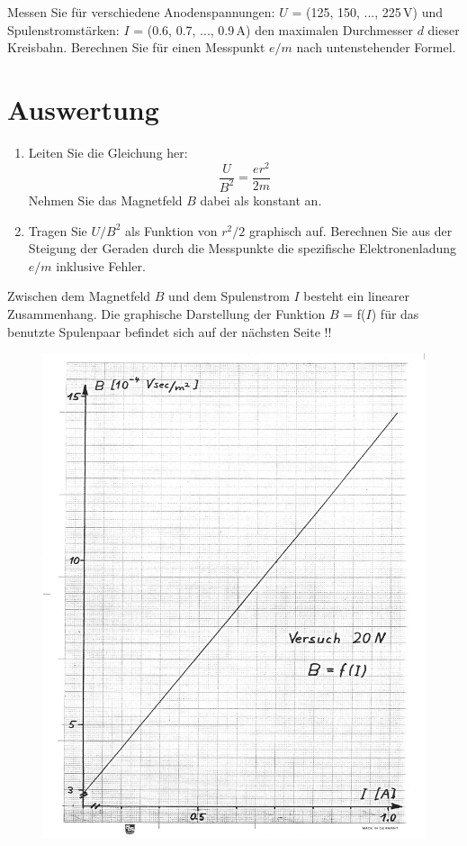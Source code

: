 \noindent
Messen Sie für verschiedene Anodenspannungen: $U$ = (125, 150, ..., 225\,V) und Spulenstromstärken: $I$ = (0.6, 0.7, ..., 0.9\,A) den maximalen Durchmesser $d$ dieser Kreisbahn. Berechnen Sie für einen Messpunkt $e/m$ nach untenstehender Formel.

\section{Auswertung} 
\begin{enumerate}
	\item Leiten Sie die Gleichung her:
		\begin{equation}
			\frac{U}{B^2} = \frac{er^2}{2m}
		\end{equation}
		Nehmen Sie das Magnetfeld $B$ dabei als konstant an.
	\item Tragen Sie $U/B^2$ als Funktion von $r^2/2$ graphisch auf. Berechnen Sie aus der Steigung der Geraden durch die Messpunkte die spezifische Elektronenladung $e/m$ inklusive Fehler.
\end{enumerate}

\begin{hint}
Zwischen dem Magnetfeld $B$ und dem Spulenstrom $I$ besteht ein linearer Zusammenhang. Die graphische Darstellung der Funktion $B$ = f($I$) für das benutzte Spulenpaar befindet sich auf der nächsten Seite !!
\end{hint}

\begin{figure}[hb]
	\centering
		\includegraphics[width=\textwidth]{Abbildungen/Eichung-HHSpulen.jpg}
	\label{fig:Eichung-HHSpulen}
\end{figure}
